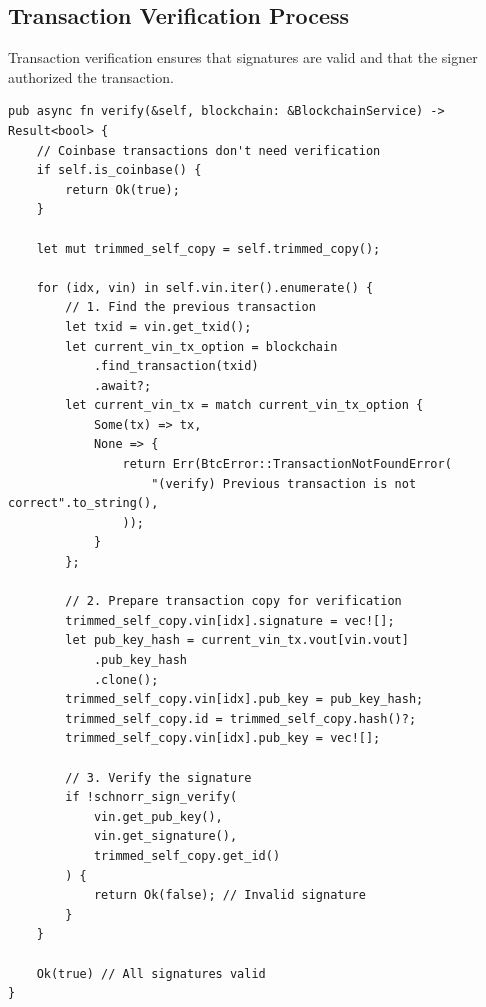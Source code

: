 \subsection{Transaction Verification Process}
\label{sec:ch08-tx-verify}

Transaction verification ensures that signatures are valid and that the signer authorized the transaction.

\begin{listing}[htbp]
\caption{Multi-input transaction verification ()}
\label{lst:ch08-tx-verify}
\begin{verbatim}
pub async fn verify(&self, blockchain: &BlockchainService) -> Result<bool> {
    // Coinbase transactions don't need verification
    if self.is_coinbase() {
        return Ok(true);
    }

    let mut trimmed_self_copy = self.trimmed_copy();

    for (idx, vin) in self.vin.iter().enumerate() {
        // 1. Find the previous transaction
        let txid = vin.get_txid();
        let current_vin_tx_option = blockchain
            .find_transaction(txid)
            .await?;
        let current_vin_tx = match current_vin_tx_option {
            Some(tx) => tx,
            None => {
                return Err(BtcError::TransactionNotFoundError(
                    "(verify) Previous transaction is not correct".to_string(),
                ));
            }
        };

        // 2. Prepare transaction copy for verification
        trimmed_self_copy.vin[idx].signature = vec![];
        let pub_key_hash = current_vin_tx.vout[vin.vout]
            .pub_key_hash
            .clone();
        trimmed_self_copy.vin[idx].pub_key = pub_key_hash;
        trimmed_self_copy.id = trimmed_self_copy.hash()?;
        trimmed_self_copy.vin[idx].pub_key = vec![];

        // 3. Verify the signature
        if !schnorr_sign_verify(
            vin.get_pub_key(),
            vin.get_signature(),
            trimmed_self_copy.get_id()
        ) {
            return Ok(false); // Invalid signature
        }
    }

    Ok(true) // All signatures valid
}
\end{verbatim}
\end{listing}

